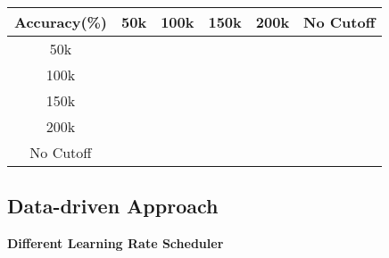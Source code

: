 \begin{table}[H]
	\centering
	\begin{tabular}{cccccc}
		\hline
		Accuracy(\%) & 50k & 100k & 150k & 200k & No Cutoff \\ \hline
		50k          &     &      &      &      &           \\ \hline
		100k         &     &      &      &      &           \\ \hline
		150k         &     &      &      &      &           \\ \hline
		200k         &     &      &      &      &           \\ \hline
		No Cutoff    &     &      &      &      &           \\ \hline
	\end{tabular}
\end{table}

\subsection{Data-driven Approach}
\textbf{Different Learning Rate Scheduler}\\

